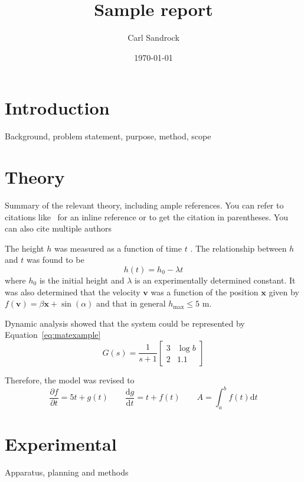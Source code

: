 \documentclass[a4paper,12pt]{article}
\title{Sample report}
\author{Carl Sandrock}
\date{\today}
\newcommand{\nomunit}[1]{%
\renewcommand{\nomentryend}{\hspace*{\fill}#1}}
\begin{document}


\section{Introduction}
Background, problem statement, purpose, method, scope

\section{Theory}
Summary of the relevant theory, including ample references. You can refer to citations like~\textcite{bruckmanmandersloot} for an inline reference or \parencite{bruckmanmandersloot} to get the citation in parentheses. You can also cite multiple authors~\parencite{mandersloot,bruckmanmandersloot}

The height $h$ \nomenclature{h}{Height \nomunit{m}} was measured as a function of time $t$ \nomenclature{t}{time \nomunit{s}}.  The relationship between $h$ and $t$ was found to be 
\begin{equation}
  \label{eq:commaexample}
  h(t) = h_0 - \lambda t
\end{equation}
where $h_0$ is the initial height and $\lambda$ is an experimentally
determined constant.  It was also determined that the velocity
$\mathbf{v}$ was a function of the position $\mathbf{x}$ given by
$f(\mathbf{v}) = \beta \mathbf{x} + \sin(\alpha)$ and that in general
$h_{\mathrm{max}} \leq 5$ m.

Dynamic analysis showed that the system could be represented by
Equation~\ref{eq:matexample}
\begin{equation}
  \label{eq:matexample}
  G(s) = \frac{1}{s+1}\left [ 
    \begin{array}{cc} 
      3 & \log{b} \\ 
      2 & \num{1.1} 
    \end{array} \right ]
\end{equation}

Therefore, the model was revised to
\begin{equation}
  \frac{\partial f}{\partial t} = 5t + g(t) \qquad \frac{\mathrm{d} g}{\mathrm{d} t} = t + f(t) \qquad A = \int_a^b f(t) \mathrm{d} t
\end{equation}


\section{Experimental}
Apparatus, planning and methods
\end{document}
